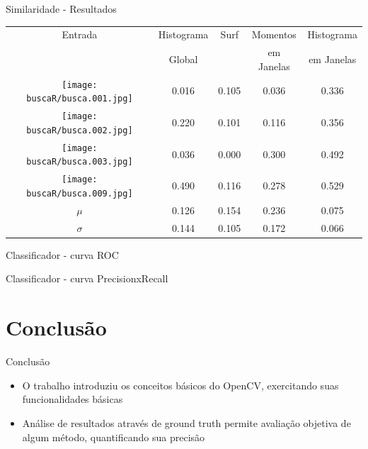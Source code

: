 \documentclass[
    style=paintings,
    paper=screen,
    blackslide,
    nopagebreaks,
    fleqn
]{powerdot}
\begin{document}
\begin{slide}{Similaridade - Resultados}
\vspace{-0.4cm}
\begin{table}[H]
\begin{center}
\begin{tabular}{|c| c | c | c | c |}
\hline
Entrada & Histograma & Surf &  Momentos  & Histograma \\
        &   Global   &      & em Janelas & em Janelas \\
\hline
\texttt{[image: buscaR/busca.001.jpg]} &
0.016 & 0.105 & 0.036 & 0.336 \\
\texttt{[image: buscaR/busca.002.jpg]} &
0.220 & 0.101 & 0.116 & 0.356 \\
\texttt{[image: buscaR/busca.003.jpg]} &
0.036 & 0.000 & 0.300 & 0.492 \\
\texttt{[image: buscaR/busca.009.jpg]} &
0.490 & 0.116 & 0.278 & 0.529 \\
\hline
$\mu$ & 0.126 & 0.154 & 0.236 & 0.075 \\
$\sigma$ & 0.144 & 0.105 & 0.172 & 0.066 \\
\hline
\end{tabular}
\end{center}
\end{table}
\end{slide}


\begin{slide}{Classificador - curva ROC}

\end{slide}


\begin{slide}{Classificador - curva PrecisionxRecall}

\end{slide}


\section[slide=false]{Conclusão}
\begin{slide}{Conclusão}
\begin{itemize}[type=1]
\item <1-> O trabalho introduziu os conceitos básicos do OpenCV, exercitando suas funcionalidades básicas
\item <2-> Análise de resultados através de ground truth permite avaliação objetiva de algum método, quantificando sua precisão
\end{itemize}
\end{slide}

%
%
\end{document}
